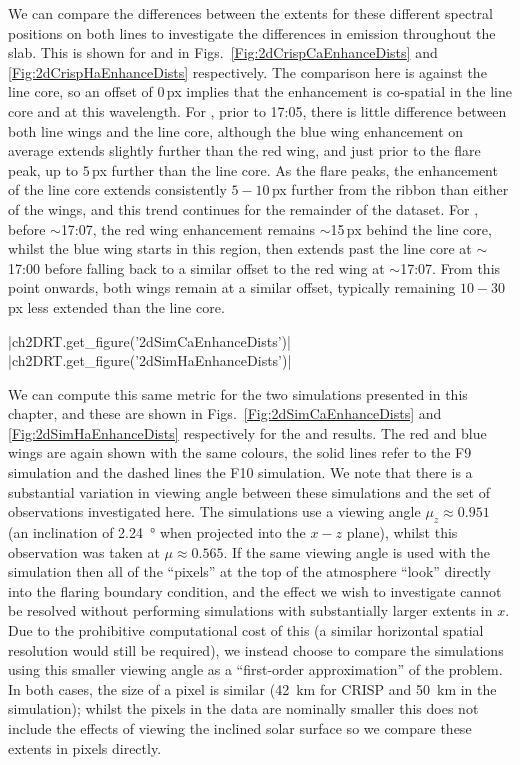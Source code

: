 We can compare the differences between the extents for these different spectral positions on both lines to investigate the differences in emission throughout the slab.
This is shown for \CaLine{} and \Ha{} in Figs.~\ref{Fig:2dCrispCaEnhanceDists} and \ref{Fig:2dCrispHaEnhanceDists} respectively.
The comparison here is against the line core, so an offset of $0$\,{}px implies that the enhancement is co-spatial in the line core and at this wavelength.
For \CaLine{}, prior to 17:05, there is little difference between both line wings and the line core, although the blue wing enhancement on average extends slightly further than the red wing, and just prior to the flare peak, up to $5$\,{}px further than the line core.
As the flare peaks, the enhancement of the line core extends consistently $5-10$\,{}px further from the ribbon than either of the wings, and this trend continues for the remainder of the dataset.
For \Ha{}, before $\sim$17:07, the red wing enhancement remains $\sim$15\,{}px behind the line core, whilst the blue wing starts in this region, then extends past the line core at $\sim$17:00 before falling back to a similar offset to the red wing at $\sim$17:07.
From this point onwards, both wings remain at a similar offset, typically remaining $10-30$\,{}px less extended than the line core.

\py[2DRT]|ch2DRT.get_figure('2dSimCaEnhanceDists')|
\py[2DRT]|ch2DRT.get_figure('2dSimHaEnhanceDists')|

We can compute this same metric for the two simulations presented in this chapter, and these are shown in Figs.~\ref{Fig:2dSimCaEnhanceDists} and \ref{Fig:2dSimHaEnhanceDists} respectively for the \CaLine{} and \Ha{} results.
The red and blue wings are again shown with the same colours, the solid lines refer to the F9 simulation and the dashed lines the F10 simulation.
We note that there is a substantial variation in viewing angle between these simulations and the set of observations investigated here.
The simulations use a viewing angle $\mu_z\approx0.951$ (an inclination of \SI{2.24}{\degree} when projected into the $x-z$ plane), whilst this observation was taken at $\mu\approx0.565$.
If the same viewing angle is used with the simulation then all of the ``pixels'' at the top of the atmosphere ``look'' directly into the flaring boundary condition, and the effect we wish to investigate cannot be resolved without performing simulations with substantially larger extents in $x$.
Due to the prohibitive computational cost of this (a similar horizontal spatial resolution would still be required), we instead choose to compare the simulations using this smaller viewing angle as a ``first-order approximation'' of the problem.
In both cases, the size of a pixel is similar (\SI{42}{\kilo\metre} for CRISP and \SI{50}{\kilo\metre} in the simulation); whilst the pixels in the data are nominally smaller this does not include the effects of viewing the inclined solar surface so we compare these extents in pixels directly.

